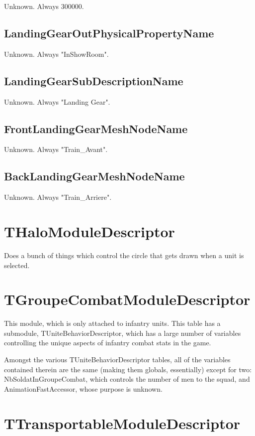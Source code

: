 \documentclass{article}
\begin{document}
Unknown. Always 300000.

\subsection{LandingGearOutPhysicalPropertyName}

Unknown. Always "InShowRoom".

\subsection{LandingGearSubDescriptionName}

Unknown. Always "Landing Gear".

\subsection{FrontLandingGearMeshNodeName}

Unknown. Always "Train\_Avant".

\subsection{BackLandingGearMeshNodeName}

Unknown. Always "Train\_Arriere".

\section{THaloModuleDescriptor}

Does a bunch of things which control the circle that gets drawn when a unit is selected.

\section{TGroupeCombatModuleDescriptor}

This module, which is only attached to infantry units. This table has a submodule, TUniteBehaviorDescriptor, which has a large number of variables controlling the unique aspects of infantry combat stats in the game.

Amongst the various TUniteBehaviorDescriptor tables, all of the variables contained therein are the same (making them globals, essentially) except for two: NbSoldatInGroupeCombat, which controls the number of men to the squad, and AnimationFastAccessor, whose purpose is unknown.

\section{TTransportableModuleDescriptor}
\end{document}
